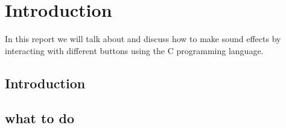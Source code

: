 \documentclass[12pt]{report}
\begin{document}
\chapter{Introduction}
In this report we will talk about and discuss how to make sound effects by interacting with different buttons using the C programming language.   
\section{Introduction}
\section{what to do}
\end{document}
